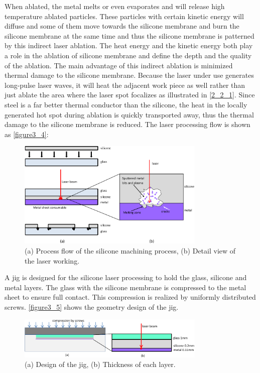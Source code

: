 When ablated, the metal melts or even evaporates and will release high temperature ablated particles. These particles with certain kinetic energy will diffuse and some of them move towards the silicone membrane and burn the silicone membrane at the same time and thus the silicone membrane is patterned by this indirect laser ablation. The heat energy and the kinetic energy both play a role in the ablation of silicone membrane and define the depth and the quality of the ablation. The main advantage of this indirect ablation is minimized thermal damage to the silicone membrane. Because the laser under use generates long-pulse laser waves, it will heat the adjacent work piece as well rather than just ablate the area where the laser spot focalizes as illustrated in \autoref{2_2_1}. Since steel is a far better thermal conductor than the silicone, the heat in the locally generated hot spot during ablation is quickly transported away, thus the thermal damage to the silicone membrane is reduced. The laser processing flow is shown as \autoref{figure3_4}:\\

\begin{figure}[ht]%
\centering
\includegraphics[width=0.8\textwidth]{figures/designandfabrication/figure3_4}%
\caption{(a) Process flow of the silicone machining process, (b) Detail view of the laser working.}%
\label{figure3_4}%
\end{figure}

A jig is designed for the silicone laser processing to hold the glass, silicone and metal layers. The glass with the silicone membrane is compressed to the metal sheet to ensure full contact. This compression is realized by uniformly distributed screws. \autoref{figure3_5} shows the geometry design of the jig.\\

\begin{figure}[t]%
\centering
\includegraphics[width=0.8\textwidth]{figures/designandfabrication/figure3_5}%
\caption{(a) Design of the jig, (b) Thickness of each layer.}%
\label{figure3_5}%
\end{figure}

